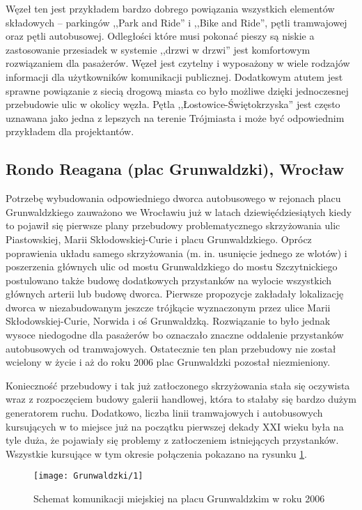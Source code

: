 \documentclass[twoside,12pt]{article}
\begin{document}
	Węzeł ten jest przykładem bardzo dobrego powiązania wszystkich elementów składowych -- parkingów ,,Park and Ride'' i ,,Bike and Ride'', pętli tramwajowej oraz pętli autobusowej. Odległości które musi pokonać pieszy są niskie a zastosowanie przesiadek w systemie ,,drzwi w drzwi'' jest komfortowym rozwiązaniem dla pasażerów. Węzeł jest czytelny i wyposażony w wiele rodzajów informacji dla użytkowników komunikacji publicznej. Dodatkowym atutem jest sprawne powiązanie z siecią drogową miasta co było możliwe dzięki jednoczesnej przebudowie ulic w okolicy węzła. Pętla ,,Łostowice-Świętokrzyska'' jest często uznawana jako jedna z lepszych na terenie Trójmiasta i może być odpowiednim przykładem dla projektantów.
	
	\clearpage
	\subsection{Rondo Reagana (plac Grunwaldzki), Wrocław}
	
	Potrzebę wybudowania odpowiedniego dworca autobusowego w rejonach placu Grunwaldzkiego zauważono we Wrocławiu już w latach dziewięćdziesiątych kiedy to pojawił się pierwsze plany przebudowy problematycznego skrzyżowania ulic Piastowskiej, Marii Skłodowskiej-Curie i placu Grunwaldzkiego. Oprócz poprawienia układu samego skrzyżowania (m. in. usunięcie jednego ze wlotów) i poszerzenia głównych ulic od mostu Grunwaldzkiego do mostu Szczytnickiego postulowano także budowę dodatkowych przystanków na wylocie wszystkich głównych arterii lub budowę dworca. Pierwsze propozycje zakładały lokalizację dworca w niezabudowanym jeszcze trójkącie wyznaczonym przez ulice Marii Skłodowskiej-Curie, Norwida i oś Grunwaldzką. Rozwiązanie to było jednak wysoce niedogodne dla pasażerów bo oznaczało znaczne oddalenie przystanków autobusowych od tramwajowych. Ostatecznie ten plan przebudowy nie został wcielony w życie i aż do roku 2006 plac Grunwaldzki pozostał niezmieniony. 
	
	Konieczność przebudowy i tak już zatłoczonego skrzyżowania stała się oczywista wraz z rozpoczęciem budowy galerii handlowej, która to stałaby się bardzo dużym generatorem ruchu. Dodatkowo, liczba linii tramwajowych i autobusowych kursujących w to miejsce już na początku pierwszej dekady XXI wieku była na tyle duża, że pojawiały się problemy z zatłoczeniem istniejących przystanków. Wszystkie kursujące w tym okresie połączenia pokazano na rysunku \ref{grunwaldzki1}.
	
	\begin{figure}[H]
		\centering
		\texttt{[image: Grunwaldzki/1]}\\
		\caption{Schemat komunikacji miejskiej na placu Grunwaldzkim w roku 2006}
		\label{grunwaldzki1}
	\end{figure}
	
\end{document}

